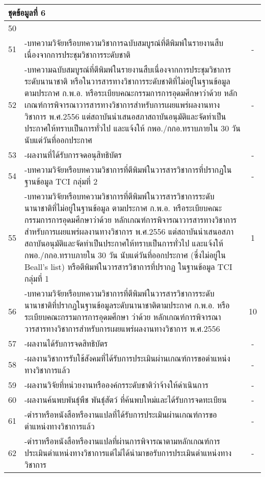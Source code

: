 \begin{longtable}{|c|p{}|c|}
	\multicolumn{3}{|l|}{\textbf{ชุดข้อมูลที่ 6}}\\\hline
	50&\cellcolor{red!10}{จำนวนรวมของผลงานทางวิชาการของอาจารย์ประจำหลักสูตร}&\cellcolor{red!10}{\textbf{11}}\\\hline
	51&-บทความวิจัยหรือบทความวิชาการฉบับสมบูรณ์ที่ตีพิมพ์ในรายงานสืบเนื่องจากการประชุมวิชาการระดับชาติ&-\\\hline
	52&-บทความฉบับสมบูรณ์ที่ตีพิมพ์ในรายงานสืบเนื่องจากการประชุมวิชาการระดับนานาชาติ หรือในวารสารทางวิชาการระดับชาติที่ไม่อยู่ในฐานข้อมูล ตามประกาศ ก.พ.อ. หรือระเบียบคณะกรรมการการอุดมศึกษาว่าด้วย หลักเกณฑ์การพิจารณาวารสารทางวิชาการสำหรับการเผยแพร่ผลงานทางวิชาการ พ.ศ.2556 แต่สถาบันนำเสนอสภาสถาบันอนุมัติและจัดทำเป็นประกาศให้ทราบเป็นการทั่วไป และแจ้งให้ กพอ./กกอ.ทราบภายใน 30 วันนับแต่วันที่ออกประกาศ
	& - \\\hline
	53&-ผลงานที่ได้รับการจดอนุสิทธิบัตร & -\\\hline
	54&-บทความวิจัยหรือบทความวิชาการที่ตีพิมพ์ในวารสารวิชาการที่ปรากฏในฐานข้อมูล TCI กลุ่มที่ 2& - \\\hline
	55&-บทความวิจัยหรือบทความวิชาการที่ตีพิมพ์ในวารสารวิชาการระดับนานาชาติที่ไม่อยู่ในฐานข้อมูล ตามประกาศ ก.พ.อ. หรือระเบียบคณะกรรมการการอุดมศึกษาว่าด้วย หลักเกณฑ์การพิจารณาวารสารทางวิชาการสำหรับการเผยแพร่ผลงานทางวิชาการ พ.ศ.2556 แต่สถาบันนำเสนอสภาสถาบันอนุมัติและจัดทำเป็นประกาศให้ทราบเป็นการทั่วไป และแจ้งให้  กพอ./กกอ.ทราบภายใน 30 วัน นับแต่วันที่ออกประกาศ (ซึ่งไม่อยู่ใน Beall’s list) หรือตีพิมพ์ในวารสารวิชาการที่ปรากฏ ในฐานข้อมูล TCI กลุ่มที่ 1& 1 \\\hline
	56&-บทความวิจัยหรือบทความวิชาการที่ตีพิมพ์ในวารสารวิชาการระดับนานาชาติที่ปรากฏในฐานข้อมูลระดับนานาชาติตามประกาศ ก.พ.อ. หรือระเบียบคณะกรรมการการอุดมศึกษา ว่าด้วย หลักเกณฑ์การพิจารณาวารสารทางวิชาการสำหรับการเผยแพร่ผลงานทางวิชาการ พ.ศ.2556 & 10 \\\hline
	57&-ผลงานได้รับการจดสิทธิบัตร& - \\\hline
	58&-ผลงานวิชาการรับใช้สังคมที่ได้รับการประเมินผ่านเกณฑ์การขอตำแหน่งทางวิชาการแล้ว& - \\\hline
	59&-ผลงานวิจัยที่หน่วยงานหรือองค์กรระดับชาติว่าจ้างให้ดำเนินการ& - \\\hline
	60&-ผลงานค้นพบพันธุ์พืช พันธุ์สัตว์ ที่ค้นพบใหม่และได้รับการจดทะเบียน&-\\\hline
	61&-ตำราหรือหนังสือหรืองานแปลที่ได้รับการประเมินผ่านเกณฑ์การขอตำแหน่งทางวิชาการแล้ว&-\\\hline
	62&-ตำราหรือหนังสือหรืองานแปลที่ผ่านการพิจารณาตามหลักเกณฑ์การประเมินตำแหน่งทางวิชาการแต่ไม่ได้นำมาขอรับการประเมินตำแหน่งทางวิชาการ&-\\\hline

\end{longtable}
